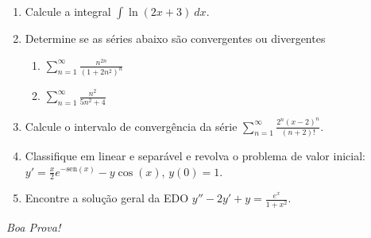\documentclass[a4paper,5pt]{amsbook}
\newcommand{\sen}{\text{sen}}
\newcommand{\ds}{\displaystyle}
\begin{document}
\vspace{0.2cm}
\begin{enumerate}
	\vspace{0.5cm}

	\item Calcule a integral $\ds{}\int\ln(2x+3)\ dx$.
	\vspace{0.5cm}

	\item Determine se as s\'eries abaixo s\~ao convergentes ou divergentes
		\begin{enumerate}
			\item $\ds{}\sum_{n=1}^\infty \frac{n^{2n}}{{(1+2{n}^2)}^n}$
			\item $\ds{}\sum_{n=1}^\infty \frac{n^2}{5n^2+4}$
		\end{enumerate}
	\vspace{0.5cm}

	\item Calcule o intervalo de converg\^encia da s\'erie $\ds{}\sum_{n=1}^\infty \frac{2^n{(x-2)}^n}{(n+2)!}$.
	\vspace{0.5cm}

	\item Classifique em linear e separ\'avel e revolva o problema de valor
		inicial: $\ds{}y' = \frac{x}{2} e^{-\sen(x)} - y\cos(x)$, $y(0) = 1$.
	\vspace{0.5cm}

	\item Encontre a solu\c{c}\~ao geral da EDO $\ds{}y''-2y' +y = \frac{e^x}{1+x^2}$.
	\vspace{0.5cm}
\end{enumerate}

\begin{flushright}
	\textit{Boa Prova!}
\end{flushright}
\end{document}
